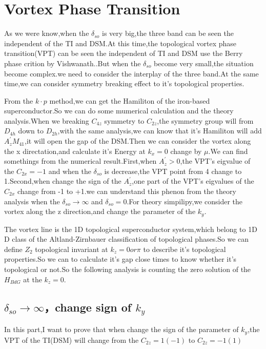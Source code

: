 \documentclass[5pt]{article}
\begin{document}
\section{Vortex Phase Transition}
As we were know,when the $\delta_{so}$ is very big,the three band can be seen the independent of the TI and DSM.At this time,the topological vortex phase transition(VPT) can be seen the independent of TI and DSM use the Berry phase crition by Vishwanath.\cite{PhysRevLett.107.097001}.But when the $\delta_{so}$ become very small,the situation become complex.we need to consider the interplay of the three band.At the same time,we can consider symmetry breaking effect to it's topological properties.
\par 
From the $k\cdot p$ method,we can get the Hamiliton of the iron-based superconductor.So we can do some mumerical calculation and the theory analysis.When we breaking $C_{4z}$ symmetry to $C_{2z}$,the symmetry group will from $D_{4h}$ down to $D_{2h}$,with the same analysis,we can know that it's Hamiliton will add $A_{z}^{'}M_{41}$,it will open the gap of the DSM.Then we can consider the vortex along the x directation,and calculate it's Energy at $k_x=0$ change by $\mu$.We can find somethings from the numerical result.First,when $A_z^{'}>0$,the VPT's eigvalue of the $C_{2x}=-1$ and when the $\delta_{so}$ is decrease,the VPT point from 4 change to 1.Second,when change the sign of the $A_{z}^{'}$,one part of the VPT's eigvalues of the $C_{2x}$ change from -1 to +1.we can understand this phenon from the theory analysis when the $\delta_{so}\rightarrow \infty$ and $\delta_{so}=0$.For theory simpilipy,we consider the vortex along the z direction,and change the parameter of the $k_y$.
\par 
The vortex line is the 1D topological superconductor system,which belong to 1D D class of the Altland-Zirnbauer classification of topological phases.So we can define $Z_2$ topological invariant at $k_z=0 or \pi$ to describe it's topological properties.So we can to calculate it's gap close times to know whether it's topological or not.So the following analysis is counting the zero solution of the $H_{BdG}$ at the $k_z=0$.
\subsection{$\delta_{so}\rightarrow \infty$，change sign of $k_y$}
In this part,I want to prove that when change the sign of the parameter of $k_y$,the VPT of the TI(DSM) will change from the $C_{2z}=1(-1)$ to $C_{2z}=-1(1)$






\newpage


\end{document}
